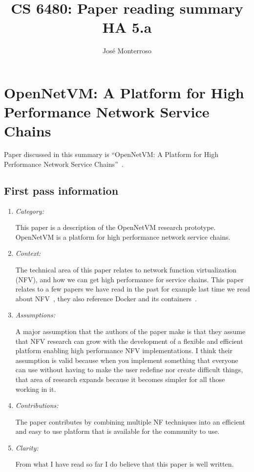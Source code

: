 \documentclass[letterpaper,twocolumn,10pt]{article}
\title{CS 6480: Paper reading summary\\
HA 5.a\\}
\author{José Monterroso}
\affil{School of Computing, University of Utah}
\begin{document}
\maketitle
\section{OpenNetVM: A Platform for High Performance Network Service Chains}

Paper discussed in this summary is ``OpenNetVM: A Platform for High Performance Network Service Chains''~\cite{opennetvm}.

\subsection{First pass information}
\label{sec:first}

\begin{enumerate}

\item {\it Category:} 

This paper is a description of the OpenNetVM research prototype. OpenNetVM is a platform for high performance 
network service chains. 

\item {\it Context:}

The technical area of this paper relates to network function virtualization (NFV), and how we can get high 
performance for service chains. This paper relates to a few papers we have read in the past for example
last time we read about NFV~\cite{nfv}, they also reference Docker and its containers~\cite{containerization}.

\item {\it Assumptions:}  

A major assumption that the authors of the paper make is that they assume that NFV research can grow
with the development of a flexible and efficient platform enabling high performance NFV implementations.
I think their assumption is valid because when you implement something that everyone can use
without having to make the user redefine nor create difficult things, that area of research expands because it becomes
simpler for all those working in it. 

\item {\it Contributions:} 

The paper contributes by combining multiple NF techniques into an efficient and easy to use platform that is available
 for the community to use.  

\item {\it Clarity:} 

From what I have read so far I do believe that this paper is well written. 

\end{enumerate}
\end{document}
